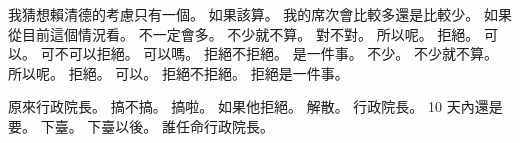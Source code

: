 \hypertarget{c01:cue:1339}{}我猜想賴清德的考慮只有一個。
\hypertarget{c01:cue:1340}{}如果該算。
\hypertarget{c01:cue:1341}{}我的席次會比較多還是比較少。
\hypertarget{c01:cue:1342}{}如果從目前這個情況看。
\hypertarget{c01:cue:1343}{}不一定會多。
\hypertarget{c01:cue:1344}{}不少就不算。
\hypertarget{c01:cue:1345}{}對不對。
\hypertarget{c01:cue:1346}{}所以呢。
\hypertarget{c01:cue:1347}{}拒絕。
\hypertarget{c01:cue:1348}{}可以。
\hypertarget{c01:cue:1349}{}可不可以拒絕。
\hypertarget{c01:cue:1350}{}可以嗎。
\hypertarget{c01:cue:1351}{}拒絕不拒絕。
\hypertarget{c01:cue:1352}{}是一件事。
\hypertarget{c01:cue:1353}{}不少。
\hypertarget{c01:cue:1354}{}不少就不算。
\hypertarget{c01:cue:1355}{}所以呢。
\hypertarget{c01:cue:1356}{}拒絕。
\hypertarget{c01:cue:1357}{}可以。
\hypertarget{c01:cue:1358}{}拒絕不拒絕。
\hypertarget{c01:cue:1359}{}拒絕是一件事。

\hypertarget{c01:cue:1360}{}原來行政院長。
\hypertarget{c01:cue:1361}{}搞不搞。
\hypertarget{c01:cue:1362}{}搞啦。
\hypertarget{c01:cue:1363}{}如果他拒絕。
\hypertarget{c01:cue:1364}{}解散。
\hypertarget{c01:cue:1365}{}行政院長。
\hypertarget{c01:cue:1366}{}10 天內還是要。
\hypertarget{c01:cue:1367}{}下臺。
\hypertarget{c01:cue:1368}{}下臺以後。
\hypertarget{c01:cue:1369}{}誰任命行政院長。

